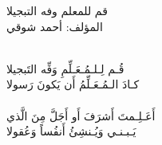 \documentclass[12pt]{article}
\begin{document}
\begin{RLtext}
\begin{center}
قم للمعلم وفه التبجيلا\\
المؤلف: أحمد شوقي\\ \\
\end{center}
\begin{flushright}
قُـم لِـلـمُـعَـلِّمِ وَفِّه التَبجيلا \\	كـادَ الـمُـعَـلِّمُ أَن يَكونَ رَسولا\\ \\
أَعَـلِـمتَ أَشرَفَ أَو أَجَلَّ مِنَ الَّذي	 \\	يَـبـنـي وَيُـنشِئُ أَنفُساً وَعُقولا
\end{flushright}
\end{RLtext}
\end{document}
